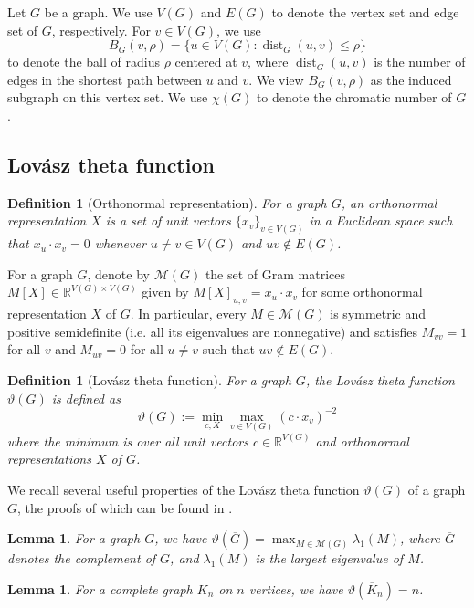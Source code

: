 \documentclass[10pt,a4paper]{amsart}
\newtheorem{lemma}[theorem]{Lemma}
\newtheorem{definition}[theorem]{Definition}
\numberwithin{theorem}{section}
\renewcommand{\le}{\leqslant}
\newcommand{\dist}{\operatorname{dist}}
\newcommand{\ov}[1]{\overline{#1}}
\begin{document}
Let $G$ be a graph. We use $V(G)$ and $E(G)$ to denote the vertex set and edge set of $G$, respectively. For $v\in V(G)$, we use
\[B_G(v,\rho)=\{u\in V(G):\dist_G(u,v)\le \rho\}\]
to denote the ball of radius $\rho$ centered at $v$, where $\dist_G(u,v)$ is the number of edges in the shortest path between $u$ and $v$. We view $B_G(v,\rho)$ as the induced subgraph on this vertex set. We use $\chi(G)$ to denote the chromatic number of $G$.


\subsection{Lov\'asz theta function} 

\begin{definition}[Orthonormal representation]
    For a graph $G$, an \emph{orthonormal representation} $X$ is a set of unit vectors $\{x_v\}_{v\in V(G)}$ in a Euclidean space such that $x_u\cdot x_v = 0$ whenever $u\ne v\in V(G)$ and $uv\not\in E(G)$.
\end{definition}

For a graph $G$, denote by $\mathcal M(G)$ 
the set of Gram matrices $M[X]\in \mathbb{R}^{V(G)\times V(G)}$ given by $M[X]_{u,v} = x_u\cdot x_v$ for some orthonormal representation $X$ of $G$. In particular, every $M\in \mathcal{M}(G)$ is symmetric and positive semidefinite (i.e. all its eigenvalues are nonnegative) and satisfies $M_{vv}=1$ for all $v$ and $M_{uv}=0$ for all $u\neq v$ such that $uv\notin E(G)$.

\begin{definition}[Lov\'asz theta function]
    For a graph $G$, the Lov\'asz theta function $\vartheta(G)$ is defined as 
    \[\vartheta(G) := \min_{c,X}\max_{v\in V(G)}(c\cdot x_v)^{-2}\]
    where the minimum is over all unit vectors $c\in \mathbb{R}^{V(G)}$ and orthonormal representations $X$ of $G$.
\end{definition}

 We recall several useful properties of the Lov\'asz theta function $\vartheta(G)$ of a graph $G$, the proofs of which can be found in \cite{JanzerYip2026ShortMonochromaticOddCycles}.

\begin{lemma}\label{lem:spectral-theta}
    For a graph $G$, we have $\vartheta(\ov G)=\max_{M\in\mathcal M(G)}\lambda_1(M)$, where $\ov G$ denotes the complement of $G$, and $\lambda_1(M)$ is the largest eigenvalue of $M$.
\end{lemma}

\begin{lemma}\label{lem:theta-complete-graph}
    For a complete graph $K_n$ on $n$ vertices, we have $\vartheta(\ov K_n) = n$.
\end{lemma}
\end{document}
